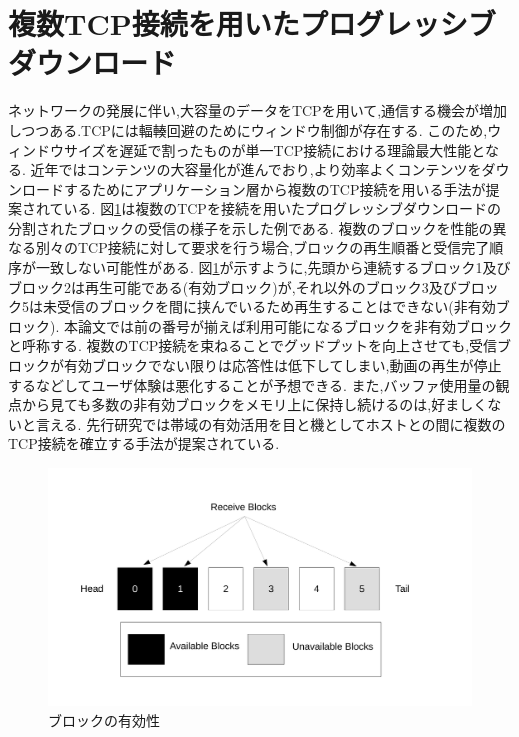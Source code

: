 \documentclass[a4j,12pt]{gradthesis_utf8}
\begin{document}
\newpage

\section{複数TCP接続を用いたプログレッシブダウンロード}
\label{hukusu}
ネットワークの発展に伴い,大容量のデータをTCPを用いて,通信する機会が増加しつつある.TCPには輻輳回避のためにウィンドウ制御が存在する.
このため,ウィンドウサイズを遅延で割ったものが単一TCP接続における理論最大性能となる.
近年ではコンテンツの大容量化が進んでおり,より効率よくコンテンツをダウンロードするためにアプリケーション層から複数のTCP接続を用いる手法が提案されている.
図\ref{block}は複数のTCPを接続を用いたプログレッシブダウンロードの分割されたブロックの受信の様子を示した例である.
複数のブロックを性能の異なる別々のTCP接続に対して要求を行う場合,ブロックの再生順番と受信完了順序が一致しない可能性がある.
図\ref{block}が示すように,先頭から連続するブロック1及びブロック2は再生可能である(有効ブロック)が,それ以外のブロック3及びブロック5は未受信のブロックを間に挟んでいるため再生することはできない(非有効ブロック).
本論文では前の番号が揃えば利用可能になるブロックを非有効ブロックと呼称する.
複数のTCP接続を束ねることでグッドプットを向上させても,受信ブロックが有効ブロックでない限りは応答性は低下してしまい,動画の再生が停止するなどしてユーザ体験は悪化することが予想できる.
また,バッファ使用量の観点から見ても多数の非有効ブロックをメモリ上に保持し続けるのは,好ましくないと言える.
先行研究では帯域の有効活用を目と機としてホストとの間に複数のTCP接続を確立する手法が提案されている\cite{hiraoka}.

\begin{figure}[h]
	\centering
	\includegraphics[width=17cm]{figure/block.pdf}
	\caption{ブロックの有効性}
	\label{block}
\end{figure}

\end{document}
